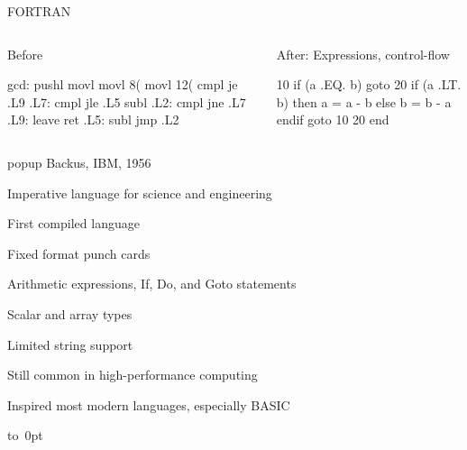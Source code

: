 \documentclass{plt}
\newenvironment{leftpopup}{
\begin{lrbox}{\shadowblockbox}%
\begin{beamercolorbox}[rounded=true,shadow=true,wd={0.5\textwidth},sep=0pt,leftskip=3pt]{popup}}{\end{beamercolorbox}
\end{lrbox}%
\noindent
\hbox{\vbox to 0pt{\vss\only<2>{\usebox{\shadowblockbox}}}}%
}
\begin{document}
\begin{frame}[fragile]{FORTRAN}

  \begin{columns}
    \begin{column}[t]{0.5\textwidth}
      
  \alert{Before}

  \medskip

\begin{shadedverbatim}
gcd: pushl %
     movl  %
     movl  8(%
     movl  12(%
     cmpl  %
     je    .L9
.L7: cmpl  %
     jle   .L5
     subl  %
.L2: cmpl  %
     jne   .L7
.L9: leave
     ret
.L5: subl  %
     jmp   .L2
\end{shadedverbatim}

    \end{column}
\begin{column}[t]{0.5\textwidth}

  \alert{After: Expressions, control-flow}

  \medskip

\begin{fortran}
 10   if (a .EQ. b) goto 20
      if (a .LT. b) then
         a = a - b
      else
         b = b - a
      endif
      goto 10
 20   end
\end{fortran}

\end{column}
  \end{columns}

  \vfill
  
\begin{leftpopup}
Backus, IBM, 1956

Imperative language for science and engineering

First compiled language

Fixed format punch cards

Arithmetic expressions, If, Do, and Goto statements

Scalar and array types

Limited string support

Still common in high-performance computing

Inspired most modern languages, especially BASIC
\end{leftpopup}


\end{frame}
\end{document}
